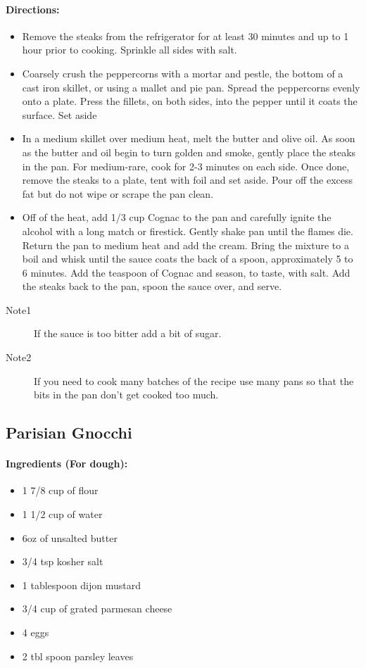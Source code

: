 \documentclass{article}
\begin{document}
\paragraph{Directions:}
\begin{itemize}
	\item Remove the steaks from the refrigerator for at least 30 minutes and up to 1 hour prior to cooking. Sprinkle all sides with salt. 
	\item Coarsely crush the peppercorns with a mortar and pestle, the bottom of a cast iron skillet, or using a mallet and pie pan. Spread the peppercorns evenly onto a plate. Press the fillets, on both sides, into the pepper until it coats the surface. Set aside
	\item In a medium skillet over medium heat, melt the butter and olive oil. As soon as the butter and oil begin to turn golden and smoke, gently place the steaks in the pan. For medium-rare, cook for 2-3 minutes on each side. Once done, remove the steaks to a plate, tent with foil and set aside. Pour off the excess fat but do not wipe or scrape the pan clean. 
	\item Off of the heat, add 1/3 cup Cognac to the pan and carefully ignite the alcohol with a long match or firestick. Gently shake pan until the flames die. Return the pan to medium heat and add the cream. Bring the mixture to a boil and whisk until the sauce coats the back of a spoon, approximately 5 to 6 minutes. Add the teaspoon of Cognac and season, to taste, with salt. Add the steaks back to the pan, spoon the sauce over, and serve.
\end{itemize}

\begin{description}
	\item[Note1] If the sauce is too bitter add a bit of sugar.
	\item[Note2] If you need to cook many batches of the recipe use many pans so that the bits in the pan don't get cooked too much.
\end{description}

\subsection{Parisian Gnocchi}

\paragraph{Ingredients (For dough):}

\begin{itemize}
	\item 1 7/8 cup of flour
	\item 1 1/2 cup of water
	\item 6oz of unsalted butter
	\item 3/4 tsp kosher salt
	\item 1 tablespoon dijon mustard
	\item 3/4 cup of grated parmesan cheese
	\item 4 eggs
	\item 2 tbl spoon parsley leaves
\end{itemize}
\end{document}
